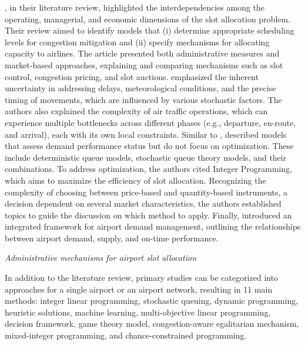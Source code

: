, in their literature review, highlighted the interdependencies among the operating, managerial, and economic dimensions of the slot allocation problem. Their review aimed to identify models that (i) determine appropriate scheduling levels for congestion mitigation and (ii) specify mechanisms for allocating capacity to airlines. The article presented both administrative measures and market-based approaches, explaining and comparing mechanisms such as slot control, congestion pricing, and slot auctions.  emphasized the inherent uncertainty in addressing delays, meteorological conditions, and the precise timing of movements, which are influenced by various stochastic factors. The authors also explained the complexity of air traffic operations, which can experience multiple bottlenecks across different phases (e.g., departure, en-route, and arrival), each with its own local constraints. Similar to ,  described models that assess demand performance status but do not focus on optimization. These include deterministic queue models, stochastic queue theory models, and their combinations. To address optimization, the authors cited Integer Programming, which aims to maximize the efficiency of slot allocation. Recognizing the complexity of choosing between price-based and quantity-based instruments, a decision dependent on several market characteristics, the authors established topics to guide the discussion on which method to apply. Finally,  introduced an integrated framework for airport demand management, outlining the relationships between airport demand, supply, and on-time performance.

\hfill \break
\textit{Administrative mechanisms for airport slot allocation}
\hfill \break

In addition to the literature review, primary studies can be categorized into approaches for a single airport or an airport network, resulting in 11 main methods: integer linear programming, stochastic queuing, dynamic programming, heuristic solutions, machine learning, multi-objective linear programming, decision framework, game theory model, congestion-aware egalitarian mechanism, mixed-integer programming, and chance-constrained programming.


